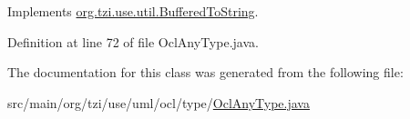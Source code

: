 Implements \hyperlink{interfaceorg_1_1tzi_1_1use_1_1util_1_1_buffered_to_string_aea95e4e53b18818d50ee253700e6e2d5}{org.\-tzi.\-use.\-util.\-Buffered\-To\-String}.



Definition at line 72 of file Ocl\-Any\-Type.\-java.



The documentation for this class was generated from the following file\-:\begin{DoxyCompactItemize}
\item 
src/main/org/tzi/use/uml/ocl/type/\hyperlink{_ocl_any_type_8java}{Ocl\-Any\-Type.\-java}\end{DoxyCompactItemize}
